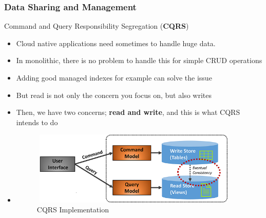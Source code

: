 \documentclass{beamer}
\begin{document}
	\begin{frame}
		\frametitle{Data Sharing and Management}
		Command and Query Responsibility Segregation (\textbf{CQRS})
		\begin{itemize}
			\item<1->[] \small{Cloud native applications need sometimes to handle huge data.}
			\vspace{1mm}
			\item<1-> \scriptsize{In monolithic, there is no problem to handle this for simple CRUD operations}
			\item<1-> \scriptsize{Adding good managed indexes for example can solve the issue}
			\item<1-> \scriptsize{But read is not only the concern you focus on, but also writes}
			\item<1-> \scriptsize{Then, we have two concerns; \textbf{read and write}, and this is what CQRS intends to do}
			
			\item<1->[]
				\begin{figure}[h]
					\includegraphics[width=100mm,height= 35mm, scale=1]{img/cqrs-implementation.png}
					\caption{CQRS Implementation}
				\end{figure}
		\end{itemize}
	\end{frame}
\end{document}
